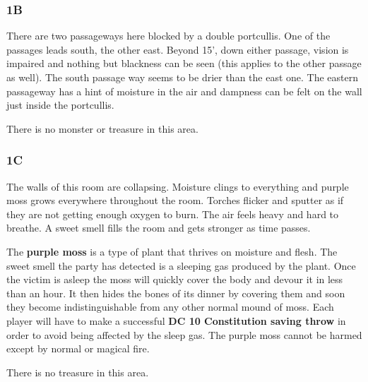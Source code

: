\documentclass[palace_of_the_silver_princess]{subfiles}
\begin{document}
\subsubsection{1B}
\begin{quotebox}
    There are two passageways here blocked by a double portcullis. One
    of the passages leads south, the other east. Beyond 15’, down either
    passage, vision is impaired and nothing but blackness can be seen
    (this applies to the other passage as well). The south passage way
    seems to be drier than the east one. The eastern passageway has a
    hint of moisture in the air and dampness can be felt on the wall
    just inside the portcullis.
\end{quotebox}

There is no monster or treasure in this area.

\subsubsection{1C}
\begin{quotebox}
    The walls of this room are collapsing. Moisture clings to everything
    and purple moss grows everywhere throughout the room. Torches
    flicker and sputter as if they are not getting enough oxygen to
    burn. The air feels heavy and hard to breathe. A sweet smell fills
    the room and gets stronger as time passes.
\end{quotebox}

The \textbf{purple moss} is a type of plant that thrives on moisture and
flesh.  The sweet smell the party has detected is a sleeping gas
produced by the plant. Once the victim is asleep the moss will quickly
cover the body and devour it in less than an hour. It then hides the
bones of its dinner by covering them and soon they become
indistinguishable from any other normal mound of moss. Each player will
have to make a successful \textbf{DC 10 Constitution saving throw} in
order to avoid being affected by the sleep gas.  The purple moss cannot
be harmed except by normal or magical fire.

There is no treasure in this area.
\end{document}

